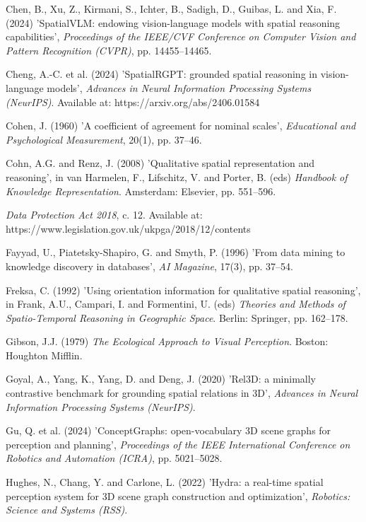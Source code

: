 \begin{description}[leftmargin=2em, labelindent=0em, itemsep=0.1em, parsep=0pt, topsep=0.3em]
\item[] Chen, B., Xu, Z., Kirmani, S., Ichter, B., Sadigh, D., Guibas, L. and Xia, F. (2024) 'SpatialVLM: endowing vision-language models with spatial reasoning capabilities', \textit{Proceedings of the IEEE/CVF Conference on Computer Vision and Pattern Recognition (CVPR)}, pp. 14455--14465.
\item[] Cheng, A.-C. et al. (2024) 'SpatialRGPT: grounded spatial reasoning in vision-language models', \textit{Advances in Neural Information Processing Systems (NeurIPS)}. Available at: https:/\allowbreak{}/\allowbreak{}arxiv.\allowbreak{}org/\allowbreak{}abs/\allowbreak{}2406.\allowbreak{}01584
\item[] Cohen, J. (1960) 'A coefficient of agreement for nominal scales', \textit{Educational and Psychological Measurement}, 20(1), pp. 37--46.
\item[] Cohn, A.G. and Renz, J. (2008) 'Qualitative spatial representation and reasoning', in van Harmelen, F., Lifschitz, V. and Porter, B. (eds) \textit{Handbook of Knowledge Representation}. Amsterdam: Elsevier, pp. 551--596.
\item[] \textit{Data Protection Act 2018}, c. 12. Available at: https:/\allowbreak{}/\allowbreak{}www.\allowbreak{}legislation.\allowbreak{}gov.\allowbreak{}uk/\allowbreak{}ukpga/\allowbreak{}2018/\allowbreak{}12/\allowbreak{}contents
\item[] Fayyad, U., Piatetsky-Shapiro, G. and Smyth, P. (1996) 'From data mining to knowledge discovery in databases', \textit{AI Magazine}, 17(3), pp. 37--54.
\item[] Freksa, C. (1992) 'Using orientation information for qualitative spatial reasoning', in Frank, A.U., Campari, I. and Formentini, U. (eds) \textit{Theories and Methods of Spatio-Temporal Reasoning in Geographic Space}. Berlin: Springer, pp. 162--178.
\item[] Gibson, J.J. (1979) \textit{The Ecological Approach to Visual Perception}. Boston: Houghton Mifflin.
\item[] Goyal, A., Yang, K., Yang, D. and Deng, J. (2020) 'Rel3D: a minimally contrastive benchmark for grounding spatial relations in 3D', \textit{Advances in Neural Information Processing Systems (NeurIPS)}.
\item[] Gu, Q. et al. (2024) 'ConceptGraphs: open-vocabulary 3D scene graphs for perception and planning', \textit{Proceedings of the IEEE International Conference on Robotics and Automation (ICRA)}, pp. 5021--5028.
\item[] Hughes, N., Chang, Y. and Carlone, L. (2022) 'Hydra: a real-time spatial perception system for 3D scene graph construction and optimization', \textit{Robotics: Science and Systems (RSS)}.

\end{description}
